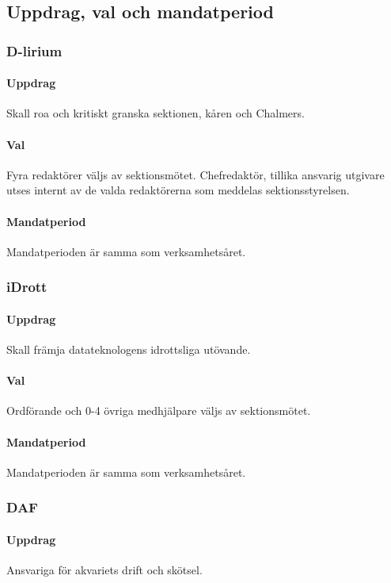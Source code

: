\documentclass[a4paper, 10pt]{article}
\begin{document}
\subsection{Uppdrag, val och mandatperiod}
\subsubsection{D-lirium}
\paragraph{Uppdrag\\}
Skall roa och kritiskt granska sektionen, kåren och Chalmers. 
\paragraph{Val\\}
Fyra redaktörer väljs av sektionsmötet. Chefredaktör, tillika ansvarig utgivare utses internt av de valda redaktörerna som meddelas sektionsstyrelsen. 
\paragraph{Mandatperiod\\}
Mandatperioden är samma som verksamhetsåret. 
\subsubsection{iDrott}
\paragraph{Uppdrag\\}
Skall främja datateknologens idrottsliga utövande. 
\paragraph{Val\\}
Ordförande och 0-4 övriga medhjälpare väljs av sektionsmötet. 
\paragraph{Mandatperiod\\}
Mandatperioden är samma som verksamhetsåret. 
\subsubsection{DAF}
\paragraph{Uppdrag\\}
Ansvariga för akvariets drift och skötsel. 
\end{document}
